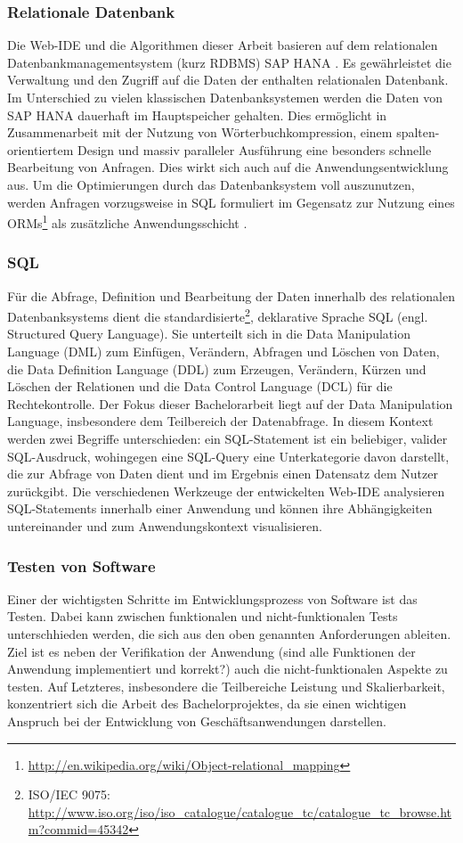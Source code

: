 \subsubsection{Relationale Datenbank}
Die Web-IDE und die Algorithmen dieser Arbeit basieren auf dem relationalen Datenbankmanagementsystem (kurz RDBMS) SAP HANA \cite{DBLP:dblp_journals/sigmod/FarberCPBSL11}.
Es gewährleistet die Verwaltung und den Zugriff auf die Daten der enthalten relationalen Datenbank.
Im Unterschied zu vielen klassischen Datenbanksystemen werden die Daten von SAP HANA dauerhaft im Hauptspeicher gehalten.
Dies ermöglicht in Zusammenarbeit mit der Nutzung von Wörterbuchkompression, einem spalten-orientiertem Design und massiv paralleler Ausführung eine besonders schnelle Bearbeitung von Anfragen.
Dies wirkt sich auch auf die Anwendungsentwicklung aus.
Um die Optimierungen durch das Datenbanksystem voll auszunutzen, werden Anfragen vorzugsweise in SQL formuliert im Gegensatz zur Nutzung eines ORMs\footnote{\url{http://en.wikipedia.org/wiki/Object-relational_mapping}} als zusätzliche Anwendungsschicht \cite{plattner_-memory_2012}.

\subsubsection{SQL}
Für die Abfrage, Definition und Bearbeitung der Daten innerhalb des relationalen Datenbanksystems dient die standardisierte\footnote{ISO/IEC 9075: \url{http://www.iso.org/iso/iso_catalogue/catalogue_tc/catalogue_tc_browse.htm?commid=45342}}, deklarative Sprache SQL \cite{DBLP:books/aw/DateD97} (engl. Structured Query Language).
Sie unterteilt sich in die Data Manipulation Language (DML) zum Einfügen, Verändern, Abfragen und Löschen von Daten, die Data Definition Language (DDL) zum Erzeugen, Verändern, Kürzen und Löschen der Relationen und die Data Control Language (DCL) für die Rechtekontrolle.
Der Fokus dieser Bachelorarbeit liegt auf der Data Manipulation Language, insbesondere dem Teilbereich der Datenabfrage.
In diesem Kontext werden zwei Begriffe unterschieden: ein SQL-Statement ist ein beliebiger, valider SQL-Ausdruck, wohingegen eine SQL-Query eine Unterkategorie davon darstellt, die zur Abfrage von Daten dient und im Ergebnis einen Datensatz dem Nutzer zurückgibt.
Die verschiedenen Werkzeuge der entwickelten Web-IDE analysieren SQL-Statements innerhalb einer Anwendung und können ihre Abhängigkeiten untereinander und zum Anwendungskontext visualisieren.

\subsubsection{Testen von Software}
Einer der wichtigsten Schritte im Entwicklungsprozess von Software ist das Testen.
Dabei kann zwischen funktionalen und nicht-funktionalen Tests unterschhieden werden, die sich aus den oben genannten Anforderungen ableiten.
Ziel ist es neben der Verifikation der Anwendung (sind alle Funktionen der Anwendung implementiert und korrekt?) auch die nicht-funktionalen Aspekte zu testen.
Auf Letzteres, insbesondere die Teilbereiche Leistung und Skalierbarkeit, konzentriert sich die Arbeit des Bachelorprojektes, da sie einen wichtigen Anspruch bei der Entwicklung von Geschäftsanwendungen darstellen.
